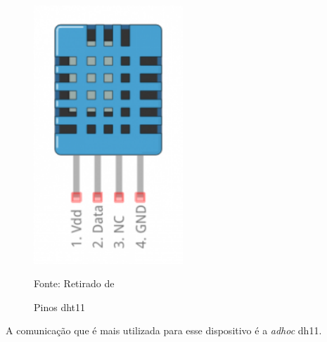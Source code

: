\documentclass[../../layout.tex]{subfiles}
\begin{document}
\begin{figure}[H]
\centering
\caption{Pinos dht11}
\includegraphics[width=0.5\textwidth]{assets/static/img/dht11_pinout.jpg}
\label{fig:dht11_pinout}

\begin{minipage}{0.5\textwidth}
\raggedright \footnotesize Fonte: Retirado de \cite{dht11_pinout} 
\end{minipage}
\end{figure}

\hspace*{3em}A comunicação que é mais utilizada para esse dispositivo é a \emph{adhoc} dh11. 
\end{document}
